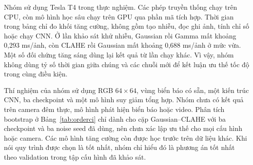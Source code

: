 Nhóm sử dụng Tesla T4 trong thực nghiệm. Các phép truyền thống chạy trên CPU, còn mô hình học sâu chạy trên GPU qua phần mã tích hợp. Thời gian trong bảng chỉ đo khối tăng cường, không gồm tạo nhiễu, đọc ghi ảnh, tính chỉ số hoặc chạy CNN. Ở lần khảo sát khử nhiễu, Gaussian rồi Gamma mất khoảng 0,293 ms/ảnh, còn CLAHE rồi Gaussian mất khoảng 0,688 ms/ảnh ở mức vừa. Một số đối chứng tăng sáng dùng lại kết quả từ lần chạy khác. Vì vậy, nhóm không dùng tỷ số thời gian giữa chúng và các chuỗi mới để kết luận ưu thế tốc độ trong cùng điều kiện.

Thí nghiệm của nhóm sử dụng RGB $64\times64$, vùng biển báo có sẵn, một kiến trúc CNN, ba checkpoint và một mô hình suy giảm tổng hợp. Nhóm chưa có kết quả trên camera đêm thực, mô hình phát hiện biển báo hoặc video. Phân tích bootstrap ở Bảng~\ref{tab:orderci} chỉ dành cho cặp Gaussian--CLAHE với ba checkpoint và ba noise seed đã dùng, nên chưa xác lập ưu thế cho mọi cấu hình hoặc camera. Các mô hình tăng cường còn được học trước trên dữ liệu khác. Khi nói quy trình được chọn là tốt nhất, nhóm chỉ hiểu đó là phương án tốt nhất theo validation trong tập cấu hình đã khảo sát.
